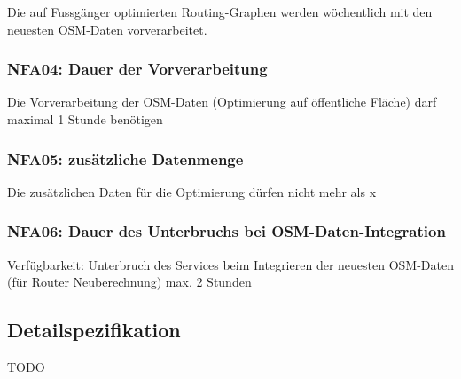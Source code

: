Die auf Fussgänger optimierten Routing-Graphen werden wöchentlich mit den neuesten \ac{OSM}-Daten vorverarbeitet.

\subsubsection{NFA04: Dauer der Vorverarbeitung}
\label{NFA:NFA04}

Die Vorverarbeitung der \ac{OSM}-Daten (Optimierung auf öffentliche Fläche) darf maximal 1 Stunde benötigen

\subsubsection{NFA05: zusätzliche Datenmenge}
\label{NFA:NFA05}

Die zusätzlichen Daten für die Optimierung dürfen nicht mehr als x%

\subsubsection{NFA06: Dauer des Unterbruchs bei OSM-Daten-Integration}
\label{NFA:NFA06}

Verfügbarkeit: Unterbruch des Services beim Integrieren der neuesten \ac{OSM}-Daten (für Router Neuberechnung) max. 2 Stunden

\subsection{Detailspezifikation}
\label{sub:Detailspezifikation}

TODO